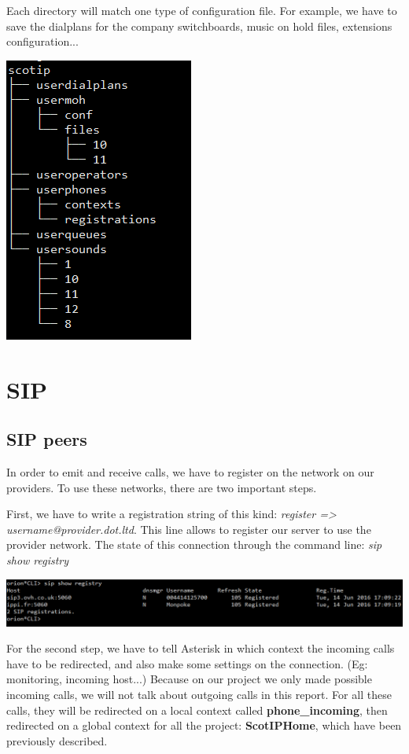 Each directory will match one type of configuration file. For example, we have to save the dialplans for the company switchboards, music on hold files, extensions configuration... 

\includegraphics[scale=1]{img/files_struct_conf.png}

\section{SIP}

\subsection{SIP peers}
In order to emit and receive calls, we have to register on the network on our providers. To use these networks, there are two important steps. 


First, we have to write a registration string of this kind: \textit{register => username@provider.dot.ltd}. This line allows to register our server to use the provider network. The state of this connection through the command line: \textit{sip show registry}

\includegraphics[width=1\textwidth]{img/sipshowregistry.png}


For the second step, we have to tell Asterisk in which context the incoming calls have to be redirected, and also make some settings on the connection. (Eg: monitoring, incoming host...)
Because on our project we only made possible incoming calls, we will not talk about outgoing calls in this report. For all these calls, they will be redirected on a local context called \textbf{phone\_incoming}, then redirected on a global context for all the project: \textbf{ScotIPHome}, which have been previously described.

